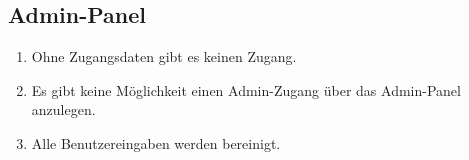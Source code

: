 \subsection{Admin-Panel}

\begin{enumerate}
    \item Ohne Zugangsdaten gibt es keinen Zugang.
    \item Es gibt keine Möglichkeit einen Admin-Zugang über das Admin-Panel anzulegen.
    \item Alle Benutzereingaben werden bereinigt.
\end{enumerate}